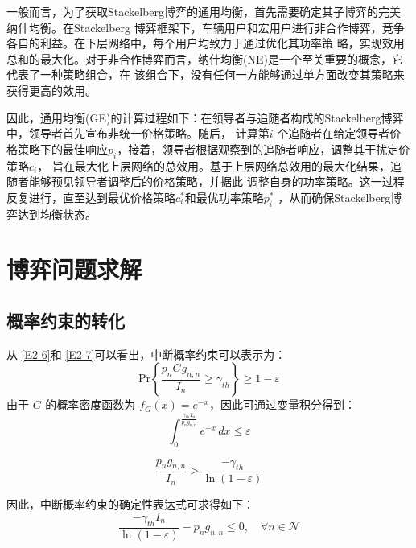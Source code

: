 一般而言，为了获取Stackelberg博弈的通用均衡，首先需要确定其子博弈的完美纳什均衡。在Stackelberg
博弈框架下，车辆用户和宏用户进行非合作博弈，竞争各自的利益。在下层网络中，每个用户均致力于通过优化其功率策
略，实现效用总和的最大化。对于非合作博弈而言，纳什均衡(NE)是一个至关重要的概念，它代表了一种策略组合，在
该组合下，没有任何一方能够通过单方面改变其策略来获得更高的效用。


因此，通用均衡(GE)的计算过程如下：在领导者与追随者构成的Stackelberg博弈中，领导者首先宣布非统一价格策略。随后，
计算第$i$ 个追随者在给定领导者价格策略下的最佳响应$p_i$，接着，领导者根据观察到的追随者响应，调整其干扰定价策略$c_i$，
旨在最大化上层网络的总效用。基于上层网络总效用的最大化结果，追随者能够预见领导者调整后的价格策略，并据此
调整自身的功率策略。这一过程反复进行，直至达到最优价格策略$c_i^*$和最优功率策略$p_i^*$
，从而确保Stackelberg博弈达到均衡状态。
\section{博弈问题求解}\label{section2-3}
\subsection{概率约束的转化}\label{section2-3-1}
从 \eqref{E2-6}和 \eqref{E2-7}可以看出，中断概率约束可以表示为：
\begin{equation}\label{E2-15}
\textrm{Pr}\left\{\frac{p_{n}G g_{n,n}}{I_n} \geq \gamma_{th}\right\}\geq1-\varepsilon
\end{equation}
由于 $G$ 的概率密度函数为 $f_G (x)=e^{-x}$，因此可通过变量积分得到：
\begin{equation}\label{E2-16}
\int_{0}^{\frac{\gamma_{th}I_{n}}{p_n g_{n,n}}} e^{-x}\, dx\leq\varepsilon
\end{equation}

\begin{equation}\label{E2-17}
\frac{p_n g_{ n,n}}{I_{n}}\geq\frac{-\gamma_{th}}{\ln(1-\varepsilon)}
\end{equation}

因此，中断概率约束的确定性表达式可求得如下：
\begin{equation}\label{E2-18}
\frac{-\gamma_{th} I_{n}}{\ln(1-\varepsilon)}-p_n g_{n,n}\leq0,\quad\forall n\in\mathcal{N}
\end{equation}
